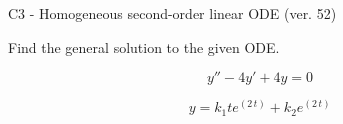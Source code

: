 \begin{exercise}
  \begin{exerciseTitle}C3 - Homogeneous second-order linear ODE (ver. 52)\end{exerciseTitle}
  \begin{exerciseStatement}
    
Find the general solution to the given ODE.

    
\[y''-4y'+4y = 0\]

  \end{exerciseStatement}
  \begin{exerciseAnswer}
    
\[y= k_{1} t e^{\left(2 \, t\right)} + k_{2} e^{\left(2 \, t\right)}\]

  \end{exerciseAnswer}
\end{exercise}